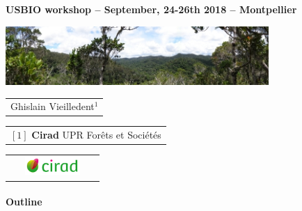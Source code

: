 {

  \begin{frame}[plain]
    \begin{center}
      \small{\textbf{USBIO workshop -- September, 24-26th 2018 -- Montpellier}}
    \end{center}
    \vspace{-0.5cm}
    \titlepage %
    \vspace{-2.5cm}
    \begin{center}
      \includegraphics[width=10cm]{figs/Banniere.png}
    \end{center}
    \begin{center}

      {\footnotesize
        \begin{tabular}{c}
          Ghislain Vieilledent$^{1}$
        \end{tabular}
      }

      \vspace{0.25cm}

      {\scriptsize
        \begin{tabular}{c}
          $[1]$ \textbf{Cirad} UPR Forêts et Sociétés
        \end{tabular}
      }

      \vspace{0.25cm}

      \begin{tabular}{C{1cm}C{2cm}C{1cm}}
        ~ &
        \includegraphics[height=0.7cm]{figs/Logo-Cirad.png} &
        ~
      \end{tabular}

    \end{center}
    
  \end{frame}
}


\placelogotrue
\begin{frame}
  \framesubtitle{Outline}
  \begin{columns}[c]
    \begin{column}{0.5\textwidth}
      \tableofcontents[sections={1-2}]
    \end{column}
    \begin{column}{0.5\textwidth}
      \tableofcontents[sections={3-4}]
    \end{column}
  \end{columns}
\end{frame}
\placelogofalse